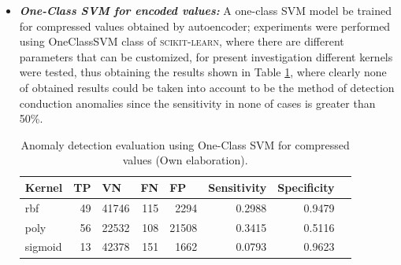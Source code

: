 \begin{itemize}
\item \textbf{\textit{One-Class SVM for encoded values: }}A one-class SVM model be trained for compressed values obtained by autoencoder; experiments were performed using OneClassSVM class of \textsc{scikit-learn}, where there are different parameters that can be customized, for present investigation different kernels were tested, thus obtaining the results shown in Table \ref{table:evaluacion_SVM_encoded}, where clearly none of obtained results could be taken into account to be the method of detection conduction anomalies since the sensitivity in none of cases is greater than 50\%.

\begin{table}[H]
\centering
\begin{center}
\begin{tabular}{|l|r|r|r|r|r|r|r|}
\hline
\textbf{Kernel} & \multicolumn{1}{l|}{\textbf{TP}} & \multicolumn{1}{l|}{\textbf{VN}}& \multicolumn{1}{l|}{\textbf{FN}}& \multicolumn{1}{l|}{\textbf{FP}} & \multicolumn{1}{l|}{\textbf{Sensitivity}} & \multicolumn{1}{l|}{\textbf{Specificity}} \\ \hline
rbf & \cellcolor[HTML]{AADD99} 49 & \cellcolor[HTML]{AADD99} 41746 & \cellcolor[HTML]{FFCE93} 115 & \cellcolor[HTML]{FFCE93} 2294 & 0.2988 & 0.9479 \\ \hline
poly & \cellcolor[HTML]{AADD99} 56 & \cellcolor[HTML]{AADD99} 22532 & \cellcolor[HTML]{FFCE93} 108 & \cellcolor[HTML]{FFCE93} 21508 & 0.3415 & 0.5116 \\ \hline
sigmoid & \cellcolor[HTML]{AADD99} 13 & \cellcolor[HTML]{AADD99} 42378 & \cellcolor[HTML]{FFCE93} 151 & \cellcolor[HTML]{FFCE93} 1662 & 0.0793 & 0.9623 \\ \hline
\end{tabular}
\end{center}
\caption{Anomaly detection evaluation using One-Class SVM for compressed values (Own elaboration).}
\label{table:evaluacion_SVM_encoded}
\end{table}


\end{itemize}
